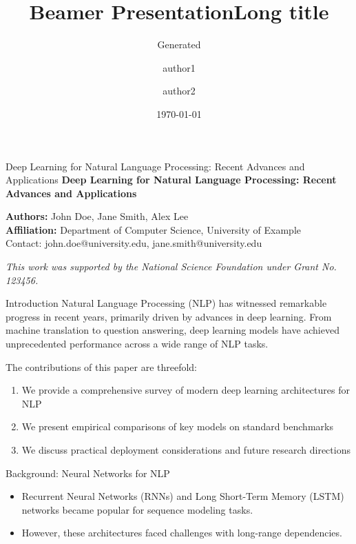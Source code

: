 \documentclass[aspectratio=169]{beamer}
\title{Beamer Presentation}
\author{Generated}
\title[short title]{Long title}
\author[short author family name split by ',']{
    author1 \inst{1,2} \and
    author2 \inst{1}
}
\institute[short notation of institute; split by ',']{
    \inst{1} inst1 %
    \inst{2} inst2  %
}
\date{\today}
\begin{document}


\begin{frame}{Deep Learning for Natural Language Processing: Recent Advances and Applications}
\centering
\vspace{1cm}
\Huge\textbf{Deep Learning for Natural Language Processing: Recent Advances and Applications}

\vspace{1cm}
\normalsize
\begin{center}
\textbf{Authors:} John Doe, Jane Smith, Alex Lee \\
\textbf{Affiliation:} Department of Computer Science, University of Example \\
\small{Contact: john.doe@university.edu, jane.smith@university.edu}
\end{center}

\vspace{1cm}
\small
\textit{This work was supported by the National Science Foundation under Grant No. 123456.}
\end{frame}

\begin{frame}{Introduction}
Natural Language Processing (NLP) has witnessed remarkable progress in recent years, primarily driven by advances in deep learning. From machine translation to question answering, deep learning models have achieved unprecedented performance across a wide range of NLP tasks.

The contributions of this paper are threefold:
\begin{enumerate}
\item We provide a comprehensive survey of modern deep learning architectures for NLP
\item We present empirical comparisons of key models on standard benchmarks
\item We discuss practical deployment considerations and future research directions
\end{enumerate}
\end{frame}

\begin{frame}{Background: Neural Networks for NLP}
\begin{itemize}
  \item Recurrent Neural Networks (RNNs) and Long Short-Term Memory (LSTM) networks became popular for sequence modeling tasks.
  \item However, these architectures faced challenges with long-range dependencies.
\end{itemize}
\end{frame}
\end{document}
